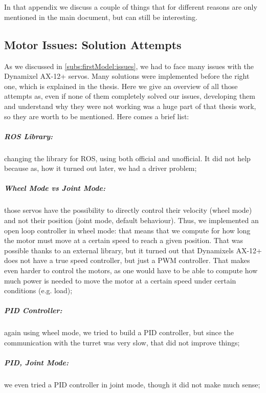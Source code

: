 \chapter{}
\label{Appen:A}
In that appendix we discuss a couple of things that for different reasons are only mentioned in the main document, but can still be interesting.
\section{Motor Issues: Solution Attempts}
As we discussed in \ref{subs:firstModel:issues}, we had to face many issues with the Dynamixel AX-12+ servos. Many solutions were implemented before the right one, which is explained in the thesis. Here we give an overview of all those attempts as, even if none of them completely solved our issues, developing them and understand why they were not working was a huge part of that thesis work, so they are worth to be mentioned. Here comes a brief list:
\paragraph{ROS Library:} changing the library for ROS, using both official and unofficial. It did not help because as, how it turned out later, we had a driver problem;
\paragraph{Wheel Mode vs Joint Mode:} those servos have the possibility to directly control their velocity (wheel mode) and not their position (joint mode, default behaviour). Thus, we implemented an open loop controller in wheel mode: that means that we compute for how long the motor must move at a certain speed to reach a given position. That was possible thanks to an external library, but it turned out that Dynamixels AX-12+ does not have a true speed controller, but just a PWM controller. That makes even harder to control the motors, as one would have to be able to compute how much power is needed to move the motor at a certain speed under certain conditions (e.g. load);
\paragraph{PID Controller:} again using wheel mode, we tried to build a PID controller, but since the communication with the turret was very slow, that did not improve things;
\paragraph{PID, Joint Mode:} we even tried a PID controller in joint mode, though it did not make much sense;
